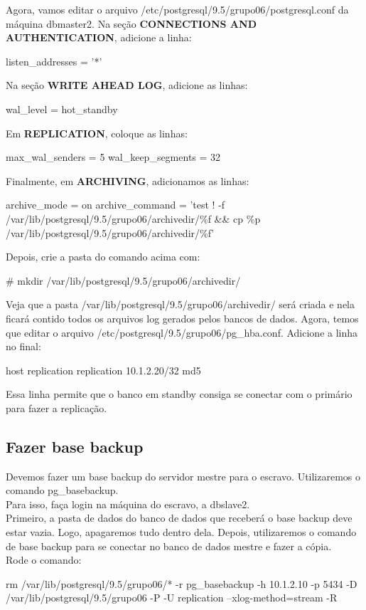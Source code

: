 \documentclass[a4paper,10pt]{article}
\begin{document}
      Agora, vamos editar o arquivo /etc/postgresql/9.5/grupo06/postgresql.conf da máquina dbmaster2.
      Na seção \textbf{CONNECTIONS AND AUTHENTICATION}, adicione a linha:
      \begin{spverbatim}
      listen_addresses = '*'
      \end{spverbatim}

      Na seção \textbf{WRITE AHEAD LOG}, adicione as linhas:
      \begin{spverbatim}
      wal_level = hot_standby
      \end{spverbatim}

      Em \textbf{REPLICATION}, coloque as linhas:
      \begin{spverbatim}
      max_wal_senders = 5
      wal_keep_segments = 32
      \end{spverbatim}

      Finalmente, em \textbf{ARCHIVING}, adicionamos as linhas:
      \begin{spverbatim}
      archive_mode = on
      archive_command = 'test ! -f /var/lib/postgresql/9.5/grupo06/archivedir/\%f && cp \%p /var/lib/postgresql/9.5/grupo06/archivedir/\%f'
      \end{spverbatim}

     Depois, crie a pasta do comando acima com:
      \begin{spverbatim}
      # mkdir /var/lib/postgresql/9.5/grupo06/archivedir/
      \end{spverbatim}

      Veja que a pasta /var/lib/postgresql/9.5/grupo06/archivedir/ será criada e nela ficará contido todos os arquivos log gerados pelos bancos de dados.
      Agora, temos que editar o arquivo /etc/postgresql/9.5/grupo06/pg\_hba.conf. Adicione a linha no final:
      \begin{spverbatim}
      host    replication     replication     10.1.2.20/32    md5
      \end{spverbatim}

      Essa linha permite que o banco em standby consiga se conectar com o primário para fazer a replicação.
    \subsection{Fazer base backup}
        Devemos fazer um base backup do servidor mestre para o escravo. Utilizaremos o comando pg\_basebackup.\\
        Para isso, faça login na máquina do escravo, a dbslave2.\\
        Primeiro, a pasta de dados do banco de dados que receberá o base backup deve estar vazia. Logo, apagaremos tudo dentro dela. Depois, utilizaremos o comando de base backup para se conectar no banco de dados mestre e fazer a cópia.\\
        Rode o comando:
        \begin{spverbatim}
        rm /var/lib/postgresql/9.5/grupo06/* -r
        pg_basebackup -h 10.1.2.10 -p 5434 -D /var/lib/postgresql/9.5/grupo06 -P -U replication --xlog-method=stream -R
        \end{spverbatim}
\end{document}

